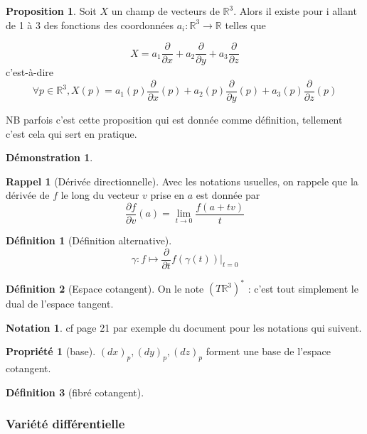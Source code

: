 \documentclass{article}
\newcommand{\R}{\mathbb{R}} %
\theoremstyle{definition} %
\newtheorem{defi}{Définition}
\newtheorem{prop}{Proposition}
\newtheorem{dem}{Démonstration}
\newtheorem{rap}{Rappel}
\newtheorem{nota}{Notation}
\newtheorem{propri}{Propriété}
\newcommand{\derp}[2]{\frac{\partial {#1}}{\partial {#2}}}
\newcommand{\1}{\mathbb{1}} %
\begin{document}
\begin{prop}
Soit $X$ un champ de vecteurs de $\R^3$.
Alors il existe pour i allant de 1 à 3 des fonctions des coordonnées $a_i : \R^3 \to \R$ telles que

$$X=a_1 \frac{\partial}{\partial x} + a_2 \frac{\partial}{\partial y} + a_3 \frac{\partial}{\partial z}$$
c'est-à-dire
$$\forall p \in \R^3, X(p)=a_1(p) \frac{\partial}{\partial x}(p) + a_2(p) \frac{\partial}{\partial y}(p) + a_3(p) \frac{\partial}{\partial z}(p)$$

\end{prop}

NB parfois c'est cette proposition qui est donnée comme définition, tellement c'est cela qui sert en pratique.

\begin{dem}
\end{dem}

\begin{rap}[Dérivée directionnelle]
Avec les notations usuelles, on rappele que la dérivée de $f$ le long du vecteur $v$ prise en $a$ est donnée par
$$\derp{f}{v} (a)= \lim_{t \to 0} \frac{f(a+tv)}{t}$$
\end{rap}

\begin{defi}[Définition alternative]
$$\gamma : f \mapsto \derp{}{t} f(\gamma(t))|_{t=0}$$
\end{defi}

\begin{defi}[Espace cotangent]
On le note $(T \R^3)^*$ : c'est tout simplement le dual de l'espace tangent.
\end{defi}

\begin{nota}
cf page 21 par exemple du document pour les notations qui suivent.
\end{nota}

\begin{propri}[base]
$(dx)_p , (dy)_p , (dz)_p$ forment une base de l'espace cotangent.
\end{propri}

\begin{defi}[fibré cotangent]

\end{defi}

\subsubsection{Variété différentielle}
\end{document}
